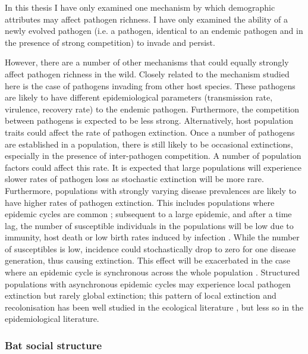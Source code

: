 In this thesis I have only examined one mechanism by which demographic attributes may affect pathogen richness.
I have only examined the ability of a newly evolved pathogen (i.e. a pathogen, identical to an endemic pathogen and in the presence of strong competition) to invade and persist.

However, there are a number of other mechanisms that could equally strongly affect pathogen richness in the wild.
Closely related to the mechanism studied here is the case of pathogens invading from other host species.
These pathogens are likely to have different epidemiological parameters (transmission rate, virulence, recovery rate) to the endemic pathogen.
Furthermore, the competition between pathogens is expected to be less strong.
Alternatively, host population traits could affect the rate of pathogen extinction.
Once a number of pathogens are established in a population, there is still likely to be occasional extinctions, especially in the presence of inter-pathogen competition.
A number of population factors could affect this rate.
It is expected that large populations will experience slower rates of pathogen loss as stochastic extinction will be more rare.
Furthermore, populations with strongly varying disease prevalences are likely to have higher rates of pathogen extinction.
This includes populations where epidemic cycles are common \cite{altizer2006sesonality}; subsequent to a large epidemic, and after a time lag, the number of susceptible individuals in the populations will be low due to immunity, host death or low birth rates induced by infection \cite{scott1987population, hethcote1994thousand}.
While the number of susceptibles is low, incidence could stochastically drop to zero for one disease generation, thus causing extinction. 
This effect will be exacerbated in the case where an epidemic cycle is synchronous across the whole population \cite{duke2011strong}.
Structured populations with asynchronous epidemic cycles may experience local pathogen extinction but rarely global extinction; this pattern of local extinction and recolonisation has been well studied in the ecological literature \cite{grenfell1995seasonality, levin1974dispersion, hanski1998metapopulation}, but less so in the epidemiological literature. %


\subsubsection{Bat social structure}

